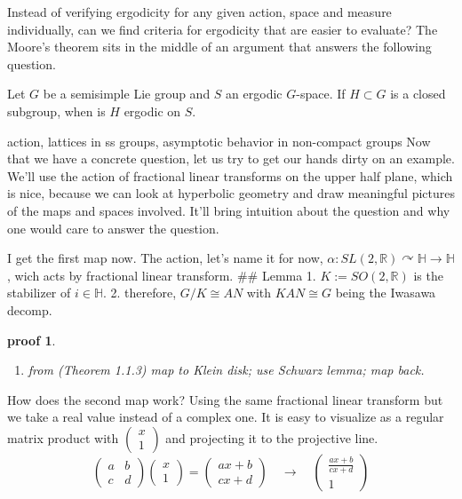 \documentclass[
]{article}
\providecommand{\tightlist}{%
  \setlength{\itemsep}{0pt}\setlength{\parskip}{0pt}}
\theoremstyle{break}
\theoremstyle{plain}
\newtheorem*{pf}{proof}
\begin{document}
Instead of verifying ergodicity for any given action, space and measure
individually, can we find criteria for ergodicity that are easier to
evaluate? The Moore's theorem sits in the middle of an argument that
answers the following question.

Let $G$ be a semisimple Lie group and $S$ an ergodic $G$-space. If
$H\subset G$ is a closed subgroup, when is $H$ ergodic on $S$.


action, lattices in ss groups, asymptotic behavior in non-compact groups
\cite{howe79}
Now that we have a concrete question, let us try to get our hands dirty
on an example. We'll use the action of fractional linear transforms on
the upper half plane, which is nice, because we can look at hyperbolic
geometry and draw meaningful pictures of the maps and spaces involved.
It'll bring intuition about the question and why one would care to
answer the question.

I get the first map now. The action, let's name it for now,
$\alpha : SL(2, \mathbb{R}) \curvearrowright \mathbb{H} \rightarrow \mathbb{H}$,
wich acts by fractional linear transform. \#\# Lemma 1.
$K:= SO(2, \mathbb{R})$ is the stabilizer of $i \in \mathbb{H}$. 2.
therefore, $G/K \cong AN$ with $KAN \cong G$ being the Iwasawa
decomp.

\begin{pf}\label{pf:miyake}
\begin{enumerate}
\def\labelenumi{\arabic{enumi}.}
\tightlist
\item
  from \cite{Miyake89}(Theorem 1.1.3) map to Klein disk; use Schwarz
  lemma; map back.
\end{enumerate}
\end{pf}

How does the second map work? Using the same fractional linear transform
but we take a real value instead of a complex one. It is easy to
visualize as a regular matrix product with
$\begin{pmatrix}x \\ 1\end{pmatrix}$ and projecting it to the
projective line. \[
\begin{pmatrix}a & b \\ c & d\end{pmatrix}\begin{pmatrix}x \\ 1\end{pmatrix} =
\begin{pmatrix}ax + b \\ cx + d\end{pmatrix} \quad \rightarrow \quad
\begin{pmatrix}\frac{ax + b}{cx + d} \\ 1\end{pmatrix}
\] 
\end{document}

